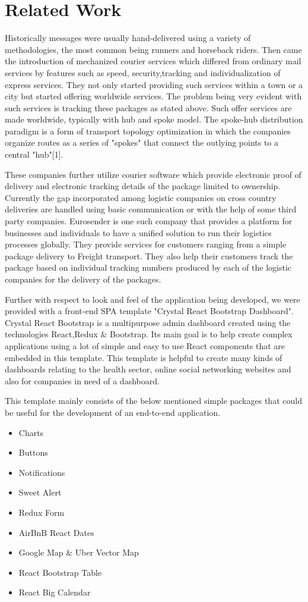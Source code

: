 \chapter{Related Work}
\label{cha:relatedwork}

Historically messages were usually hand-delivered using a variety of methodologies, the most common being runners and horseback riders. Then came the introduction of mechanized courier services which differed from ordinary mail services by features such as speed, security,tracking and individualization of express services. They not only started providing such services within a town or a city but started offering worldwide services. The problem being very evident with such services is tracking these packages as stated above. Such offer services are made worldwide, typically with hub and spoke model. The spoke-hub distribution paradigm is a form of transport topology optimization in which the companies organize routes as a series of "spokes" that connect the outlying points to a central "hub"[1].

These companies further utilize courier software which provide electronic proof of delivery and electronic tracking details of the package limited to ownership. Currently the gap incorporated among logistic companies on cross country deliveries are handled using basic communication or with the help of some third party companies. Eurosender is one such  company that provides a platform for businesses and individuals to have a unified solution to run their logistics processes globally. They provide services for customers ranging from a simple package delivery to Freight transport. They also help their customers track the package based on individual  tracking numbers produced by each of the logistic companies for the delivery of the packages.

Further with respect to look and feel of the application being developed, we were provided with a front-end SPA template "Crystal React Bootstrap Dashboard". Crystal React Bootstrap is a multipurpose admin dashboard created using the technologies React,Redux & Bootstrap. Its main goal is to help create complex applications using a lot of simple and easy to use React components that are embedded in this template. This template is helpful to create many kinds of dashboards relating to the health sector, online social networking websites and also for companies in need of a dashboard.

This template mainly consists of the below mentioned simple packages that could be useful for the development of an end-to-end application.

\begin{itemize}
\item Charts
\item Buttons
\item Notifications
\item Sweet Alert
\item Redux Form
\item AirBnB React Dates
\item Google Map & Uber Vector Map
\item React Bootstrap Table
\item React Big Calendar
\end{itemize}
